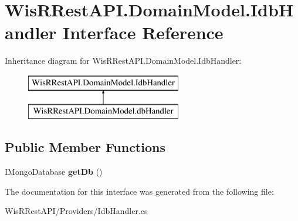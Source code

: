 \hypertarget{interface_wis_r_rest_a_p_i_1_1_domain_model_1_1_idb_handler}{}\section{Wis\+R\+Rest\+A\+P\+I.\+Domain\+Model.\+Idb\+Handler Interface Reference}
\label{interface_wis_r_rest_a_p_i_1_1_domain_model_1_1_idb_handler}
Inheritance diagram for Wis\+R\+Rest\+A\+P\+I.\+Domain\+Model.\+Idb\+Handler\+:\begin{figure}[H]
\begin{center}
\leavevmode
\includegraphics[height=2.000000cm]{interface_wis_r_rest_a_p_i_1_1_domain_model_1_1_idb_handler}
\end{center}
\end{figure}
\subsection*{Public Member Functions}
\begin{DoxyCompactItemize}
\item 
\hypertarget{interface_wis_r_rest_a_p_i_1_1_domain_model_1_1_idb_handler_a9f2fc9d53c2e3797b98d3f8ec54613b5}{}I\+Mongo\+Database {\bfseries get\+Db} ()\label{interface_wis_r_rest_a_p_i_1_1_domain_model_1_1_idb_handler_a9f2fc9d53c2e3797b98d3f8ec54613b5}

\end{DoxyCompactItemize}


The documentation for this interface was generated from the following file\+:\begin{DoxyCompactItemize}
\item 
Wis\+R\+Rest\+A\+P\+I/\+Providers/Idb\+Handler.\+cs\end{DoxyCompactItemize}
